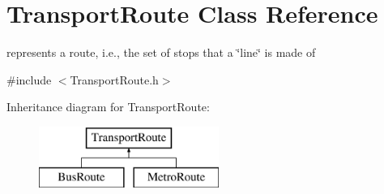 \hypertarget{class_transport_route}{}\section{Transport\+Route Class Reference}
\label{class_transport_route}


represents a route, i.\+e., the set of stops that a \char`\"{}line\char`\"{} is made of  




{\ttfamily \#include $<$Transport\+Route.\+h$>$}

Inheritance diagram for Transport\+Route\+:\begin{figure}[H]
\begin{center}
\leavevmode
\includegraphics[height=2.000000cm]{class_transport_route}
\end{center}
\end{figure}
